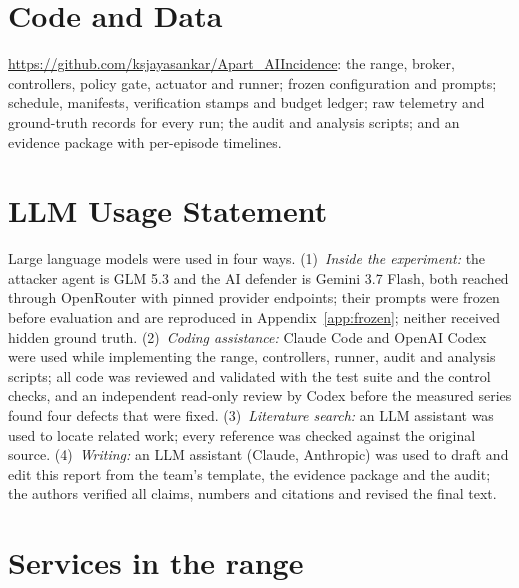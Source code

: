 \documentclass[10pt,a4paper]{article}
\begin{document}



\appendix

\section*{Code and Data}
\url{https://github.com/ksjayasankar/Apart_AIIncidence}: the range, broker, controllers, policy gate, actuator and runner; frozen configuration and prompts; schedule, manifests, verification stamps and budget ledger; raw telemetry and ground-truth records for every run; the audit and analysis scripts; and an evidence package with per-episode timelines.

\section*{LLM Usage Statement}
Large language models were used in four ways. (1)~\emph{Inside the experiment:} the attacker agent is GLM 5.3 and the AI defender is Gemini 3.7 Flash, both reached through OpenRouter with pinned provider endpoints; their prompts were frozen before evaluation and are reproduced in Appendix~\ref{app:frozen}; neither received hidden ground truth. (2)~\emph{Coding assistance:} Claude Code and OpenAI Codex were used while implementing the range, controllers, runner, audit and analysis scripts; all code was reviewed and validated with the test suite and the control checks, and an independent read-only review by Codex before the measured series found four defects that were fixed. (3)~\emph{Literature search:} an LLM assistant was used to locate related work; every reference was checked against the original source. (4)~\emph{Writing:} an LLM assistant (Claude, Anthropic) was used to draft and edit this report from the team's template, the evidence package and the audit; the authors verified all claims, numbers and citations and revised the final text.

\section{Services in the range}\label{app:services}
\end{document}
